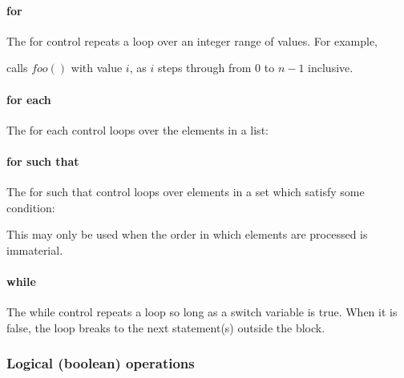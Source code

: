 \paragraph*{for}

The for control repeats a loop over an integer range of values. For example,

\begin{pseudo*}
\bsEND
\end{pseudo*}

calls $foo()$ with value $i$, as $i$ steps through from 0 to $n-1$ inclusive.


\paragraph*{for each} The for each control loops over the elements in
a list:

\begin{pseudo*}
\bsEND
\end{pseudo*}

\paragraph*{for such that} The for such that control loops over elements in
a set which satisfy some condition:

\begin{pseudo*}
\bsEND
\end{pseudo*}

This may only be used when the order in which elements are processed is 
immaterial.

\paragraph*{while}

The while control repeats a loop so long as a switch variable is true. 
When it is false, the loop breaks to the next statement(s) outside the block.

\begin{pseudo*}
\bsEND
{}
\end{pseudo*}

\subsubsection{Logical (boolean) operations}
\label{booleanops}

